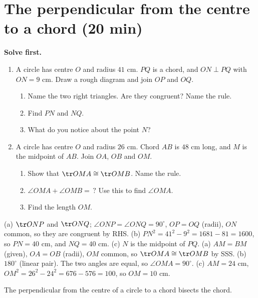 \section{The perpendicular from the centre to a chord \normalfont\small(20 min)}

\textbf{Solve first.}
\begin{enumerate}[label=\textbf{P\arabic*.},leftmargin=2.2em,itemsep=3pt,start=3]
  \item A circle has centre $O$ and radius $41$ cm. $PQ$ is a chord, and $ON\perp PQ$ with $ON=9$ cm. Draw a rough diagram and join $OP$ and $OQ$.
  \begin{enumerate}[label=(\alph*),itemsep=1pt]
    \item Name the two right triangles. Are they congruent? Name the rule.
    \item Find $PN$ and $NQ$.
    \item What do you notice about the point $N$?
  \end{enumerate}
  \item A circle has centre $O$ and radius $26$ cm. Chord $AB$ is $48$ cm long, and $M$ is the midpoint of $AB$. Join $OA$, $OB$ and $OM$.
  \begin{enumerate}[label=(\alph*),itemsep=1pt]
    \item Show that $\tr OMA\cong\tr OMB$. Name the rule.
    \item $\angle OMA+\angle OMB=\,?$ Use this to find $\angle OMA$.
    \item Find the length $OM$.
  \end{enumerate}
\end{enumerate}

\begin{answerblock}
 (a) $\tr ONP$ and $\tr ONQ$; $\angle ONP=\angle ONQ=90^\circ$, $OP=OQ$ (radii), $ON$ common, so they are congruent by RHS. (b) $PN^2=41^2-9^2=1681-81=1600$, so $PN=40$ cm, and $NQ=40$ cm. (c) $N$ is the midpoint of $PQ$.
 (a) $AM=BM$ (given), $OA=OB$ (radii), $OM$ common, so $\tr OMA\cong\tr OMB$ by SSS. (b) $180^\circ$ (linear pair). The two angles are equal, so $\angle OMA=90^\circ$. (c) $AM=24$ cm, $OM^2=26^2-24^2=676-576=100$, so $OM=10$ cm.
\end{answerblock}


\begin{theorem}
The perpendicular from the centre of a circle to a chord bisects the chord.
\end{theorem}

